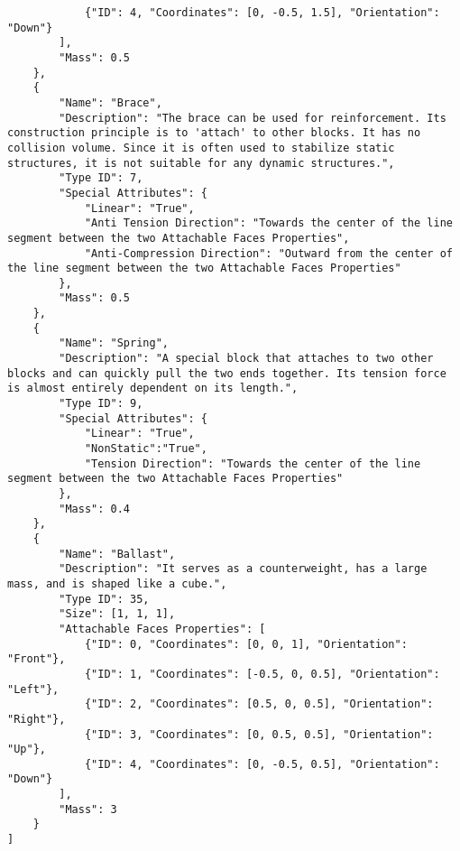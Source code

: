 \begin{lstlisting}
            {"ID": 4, "Coordinates": [0, -0.5, 1.5], "Orientation": "Down"}
        ],
        "Mass": 0.5
    },
    {
        "Name": "Brace",
        "Description": "The brace can be used for reinforcement. Its construction principle is to 'attach' to other blocks. It has no collision volume. Since it is often used to stabilize static structures, it is not suitable for any dynamic structures.",
        "Type ID": 7,
        "Special Attributes": {
            "Linear": "True",
            "Anti Tension Direction": "Towards the center of the line segment between the two Attachable Faces Properties",
            "Anti-Compression Direction": "Outward from the center of the line segment between the two Attachable Faces Properties"
        },
        "Mass": 0.5
    },
    {
        "Name": "Spring",
        "Description": "A special block that attaches to two other blocks and can quickly pull the two ends together. Its tension force is almost entirely dependent on its length.",
        "Type ID": 9,
        "Special Attributes": {
            "Linear": "True",
            "NonStatic":"True",
            "Tension Direction": "Towards the center of the line segment between the two Attachable Faces Properties"
        },
        "Mass": 0.4
    },
    {
        "Name": "Ballast",
        "Description": "It serves as a counterweight, has a large mass, and is shaped like a cube.",
        "Type ID": 35,
        "Size": [1, 1, 1],
        "Attachable Faces Properties": [
            {"ID": 0, "Coordinates": [0, 0, 1], "Orientation": "Front"},
            {"ID": 1, "Coordinates": [-0.5, 0, 0.5], "Orientation": "Left"},
            {"ID": 2, "Coordinates": [0.5, 0, 0.5], "Orientation": "Right"},
            {"ID": 3, "Coordinates": [0, 0.5, 0.5], "Orientation": "Up"},
            {"ID": 4, "Coordinates": [0, -0.5, 0.5], "Orientation": "Down"}
        ],
        "Mass": 3
    }
]
\end{lstlisting}
